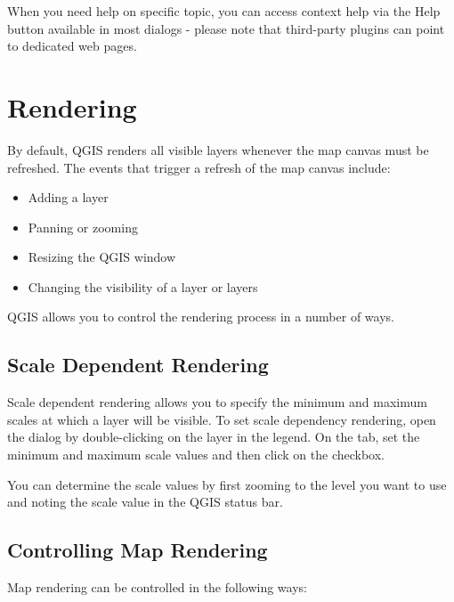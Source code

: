 When you need help on specific topic, you can access context help via the Help
button available in most dialogs - please note that third-party plugins can point to
dedicated web pages.

\section{Rendering}\label{subsec:redraw_events}

By default, QGIS renders all visible layers whenever the map canvas must be
refreshed. The events that trigger a refresh of the map canvas include:

\begin{itemize}
\item Adding a layer
\item Panning or zooming
\item Resizing the QGIS window
\item Changing the visibility of a layer or layers
\end{itemize}

QGIS allows you to control the rendering process in a number of ways.

\subsection{Scale Dependent Rendering}
\label{label_scaledepend}

Scale dependent rendering allows you to specify the minimum and maximum
scales at which a layer will be visible.  To set scale dependency rendering,
open the  dialog by double-clicking on the layer in the 
legend. On the  tab, set the minimum and maximum scale values and then
click on the  checkbox.

You can determine the scale values by first zooming to the level you want
to use and noting the scale value in the QGIS status bar.

\subsection{Controlling Map Rendering}\label{label_controlmap}

Map rendering can be controlled in the following ways:

\label{label_suspendrender}

